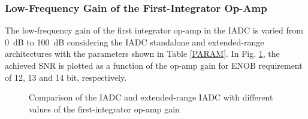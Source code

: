 \subsubsection{Low-Frequency Gain of the First-Integrator Op-Amp}
The low-frequency gain of the first integrator op-amp in the IADC is varied from 0~dB to 100~dB considering the IADC standalone and extended-range architectures with the parameters shown in Table \ref{PARAM}. In Fig. \ref{SNR_G1}, the achieved SNR is plotted as a function of the op-amp gain for ENOB requirement of 12, 13 and 14 bit, respectively.

\begin{figure}[h]
\centering
{}
\qquad
{}
\caption{Comparison of the IADC and extended-range IADC with different values of the first-integrator op-amp gain}
\label{SNR_G1}
\end{figure}


